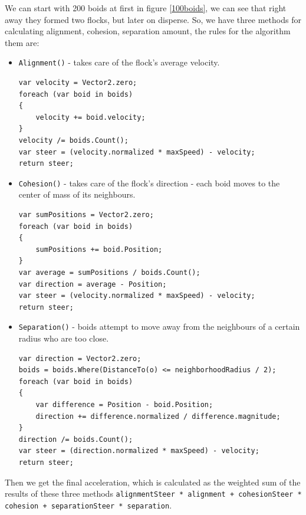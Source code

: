 \documentclass[a4paper,12pt,openright]{book}
\begin{document}
We can start with 200 boids at first in figure \ref{100boids}, we can see that right away they formed two flocks, but later on disperse. So, we have three methods for calculating alignment, cohesion, separation amount, the rules for the algorithm them are:
\begin{itemize}
    \item \texttt{Alignment()} - takes care of the flock's average velocity.

\lstset{style=sharpc}
\begin{lstlisting}
var velocity = Vector2.zero;
foreach (var boid in boids)
{
    velocity += boid.velocity;
}
velocity /= boids.Count();
var steer = (velocity.normalized * maxSpeed) - velocity;
return steer;
\end{lstlisting}

    \item \texttt{Cohesion()} - takes care of the flock's direction - each boid moves to the center of mass of its neighbours.

\begin{lstlisting}
var sumPositions = Vector2.zero;
foreach (var boid in boids)
{
    sumPositions += boid.Position;
}
var average = sumPositions / boids.Count();
var direction = average - Position;
var steer = (velocity.normalized * maxSpeed) - velocity;
return steer;
\end{lstlisting}

    \item \texttt{Separation()} - boids attempt to move away from the neighbours of a certain radius who are too close.

\begin{lstlisting}
var direction = Vector2.zero;
boids = boids.Where(DistanceTo(o) <= neighborhoodRadius / 2);
foreach (var boid in boids)
{
    var difference = Position - boid.Position;
    direction += difference.normalized / difference.magnitude;
}
direction /= boids.Count();
var steer = (direction.normalized * maxSpeed) - velocity;
return steer;
\end{lstlisting}

\end{itemize}

Then we get the final acceleration, which is calculated as the weighted sum of the results of these three methods \texttt{alignmentSteer * alignment + cohesionSteer * cohesion + separationSteer * separation}.
\end{document}
